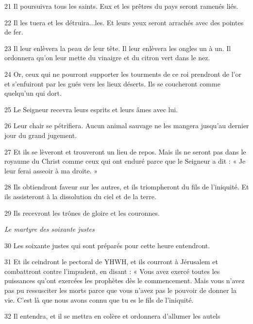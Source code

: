 \par 21 Il poursuivra tous les saints. Eux et les prêtres du pays seront ramenés liés.

\par 22 Il les tuera et les détruira...les. Et leurs yeux seront arrachés avec des pointes de fer.

\par 23 Il leur enlèvera la peau de leur tête. Il leur enlèvera les ongles un à un. Il ordonnera qu'on leur mette du vinaigre et du citron vert dans le nez.

\par 24 Or, ceux qui ne pourront supporter les tourments de ce roi prendront de l'or et s'enfuiront par les gués vers les lieux déserts. Ils se coucheront comme quelqu'un qui dort.

\par 25 Le Seigneur recevra leurs esprits et leurs âmes avec lui.

\par 26 Leur chair se pétrifiera. Aucun animal sauvage ne les mangera jusqu’au dernier jour du grand jugement.

\par 27 Et ils se lèveront et trouveront un lieu de repos. Mais ils ne seront pas dans le royaume du Christ comme ceux qui ont enduré parce que le Seigneur a dit : « Je leur ferai asseoir à ma droite. »

\par 28 Ils obtiendront faveur sur les autres, et ils triompheront du fils de l'iniquité. Et ils assisteront à la dissolution du ciel et de la terre.

\par 29 Ils recevront les trônes de gloire et les couronnes.


\par \textit{Le martyre des soixante justes}


\par 30 Les soixante justes qui sont préparés pour cette heure entendront.

\par 31 Et ils ceindront le pectoral de YHWH, et ils courront à Jérusalem et combattront contre l'impudent, en disant : « Vous avez exercé toutes les puissances qu'ont exercées les prophètes dès le commencement. Mais vous n’avez pas pu ressusciter les morts parce que vous n’avez pas le pouvoir de donner la vie. C’est là que nous avons connu que tu es le fils de l’iniquité.

\par 32 Il entendra, et il se mettra en colère et ordonnera d'allumer les autels

